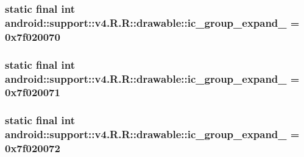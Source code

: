 \hypertarget{classandroid_1_1support_1_1v4_1_1_r_1_1drawable_fdfc67d0653da1b17fa56b882e8fb0ef}{
\subsubsection[{ic\_\-group\_\-expand\_\-01}]{\setlength{\rightskip}{0pt plus 5cm}static final int android::support::v4.R.R::drawable::ic\_\-group\_\-expand\_ = 0x7f020070}}
\label{classandroid_1_1support_1_1v4_1_1_r_1_1drawable_fdfc67d0653da1b17fa56b882e8fb0ef}


\hypertarget{classandroid_1_1support_1_1v4_1_1_r_1_1drawable_c728c9ee8bcf178ed1464eb94c52c560}{
\subsubsection[{ic\_\-group\_\-expand\_\-02}]{\setlength{\rightskip}{0pt plus 5cm}static final int android::support::v4.R.R::drawable::ic\_\-group\_\-expand\_ = 0x7f020071}}
\label{classandroid_1_1support_1_1v4_1_1_r_1_1drawable_c728c9ee8bcf178ed1464eb94c52c560}


\hypertarget{classandroid_1_1support_1_1v4_1_1_r_1_1drawable_be9360c6a90f0a8e88d59de0c5054143}{
\subsubsection[{ic\_\-group\_\-expand\_\-03}]{\setlength{\rightskip}{0pt plus 5cm}static final int android::support::v4.R.R::drawable::ic\_\-group\_\-expand\_ = 0x7f020072}}
\label{classandroid_1_1support_1_1v4_1_1_r_1_1drawable_be9360c6a90f0a8e88d59de0c5054143}


